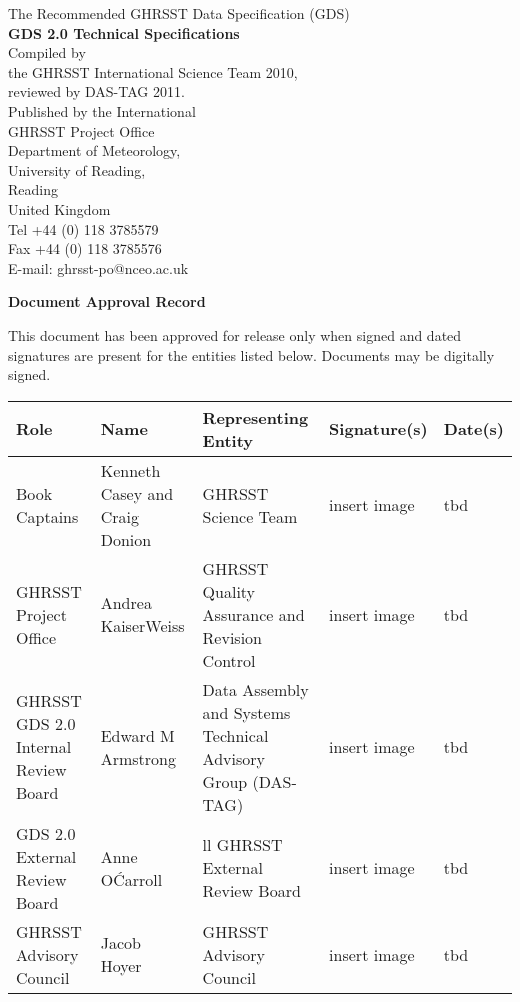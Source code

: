 \pagebreak

\begin{center}
    \vspace*{2cm}
    {\Large The Recommended GHRSST Data Specification (GDS)}\\[2cm]
    {\LARGE \textbf{GDS 2.0 Technical Specifications}}\\[2cm]
    {\large Compiled by\\the GHRSST International Science Team 2010,\\reviewed by DAS-TAG 2011.}\\[2cm]
    {\large Published by the International \\GHRSST Project Office\\
    Department of Meteorology,\\
    University of Reading,\\
    Reading\\
    United Kingdom}\\[2cm]
    {\large Tel +44 (0) 118 3785579\\
    Fax +44 (0) 118 3785576\\
    E-mail: ghrsst-po@nceo.ac.uk}\\[2cm]
\end{center}

\newpage

\textbf{\Large Document Approval Record}\par\vspace{1cm}
This document has been approved for release only when signed and dated signatures are present for
the entities listed below. Documents may be digitally signed. 
\par 
\vspace{1cm}
\begin{tabular}{|p{1.5cm}|>{\raggedright}p{2.5cm}|>{\raggedright}p{3cm}|p{4cm}|p{1.5cm}|}
    \hline \rowcolor{lightgray}
        Role & Name & Representing Entity & Signature(s) & Date(s) \\
    \hline
        Book Captains & Kenneth Casey and Craig Donion & GHRSST Science Team & insert image & tbd \\
    \hline
        GHRSST Project Office & Andrea KaiserWeiss & GHRSST Quality Assurance and Revision Control &insert image & tbd \\
    \hline
        GHRSST GDS 2.0 Internal Review Board & Edward M Armstrong & Data Assembly and Systems Technical Advisory Group (DAS-TAG) & insert image & tbd \\
    \hline
        GDS 2.0 External Review Board & Anne O\'Carroll & ll GHRSST External Review Board & insert image & tbd \\
    \hline
        GHRSST Advisory Council & Jacob Hoyer & GHRSST Advisory Council & insert image & tbd \\
    \hline
\end{tabular}

